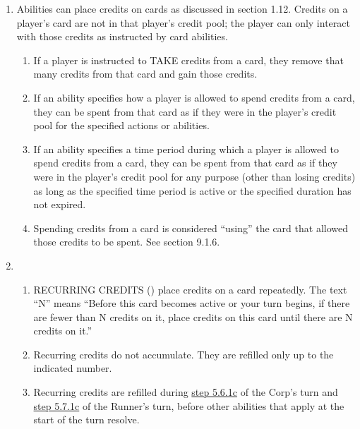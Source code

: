 \begin{enumerate}
\begin{enumerate}
		            \\[10pt]
	      \end{enumerate}
	\item Abilities can place credits on cards \textcolor{Bittersweet}{as discussed in section 1.12}. Credits on a player's card are not in that player's credit pool; the player can only interact with those credits as instructed by card abilities.
	      \begin{enumerate}
		      \item If a player is instructed to TAKE credits from a card, they remove that many credits from that card and gain those credits.
		      \item If an ability specifies how a player is allowed to spend credits from a card, they can be spent from that card as if they were in the player's credit pool for the specified actions or abilities.
		      \item If an ability specifies a time period during which a player is allowed to spend credits from a card, they can be spent from that card as if they were in the player's credit pool for any purpose (other than losing credits) as long as the specified time period is active or the specified duration has not expired.
		      \item Spending credits from a card is considered ``using'' the card \textcolor{Bittersweet}{that allowed those credits to be spent. See section 9.1.6}.
	      \end{enumerate}
	\item {}
	      \begin{enumerate}
		      \item RECURRING CREDITS (\recurring) place credits on a card repeatedly. The text ``N\recurring'' means ``Before this card becomes active or your turn begins, if there are fewer than N credits on it, place credits on this card until there are N credits on it.''
		      \item Recurring credits do not accumulate. They are refilled only up to the indicated number.
		      \item Recurring credits are refilled during \hyperlink{page.i}{step 5.6.1c} of the Corp's turn and \hyperlink{page.i}{step 5.7.1c} of the Runner's turn, before other abilities that \textcolor{Bittersweet}{apply} at the start of the turn resolve.\\[10pt]
	      \end{enumerate}
\end{enumerate}
